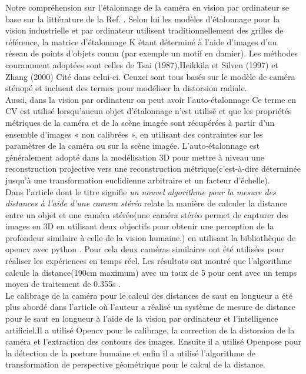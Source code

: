 \documentclass[12pt,a4paper]{report}
\begin{document}
Notre compréhension sur l'étalonnage de la caméra en vision par ordinateur se base sur la littérature de la Ref. \cite{remondino_digital_2006}. Selon lui les modèles d'étalonnage pour la vision industrielle et par ordinateur utilisent traditionnellement des grilles de référence, la matrice d'étalonnage K étant déterminé à l'aide d'images d'un réseau de points d'objets connu (par exemple un motif en damier). Les méthodes couramment adoptées sont celles de Tsai (1987),Heikkila et Silven (1997) et Zhang (2000) Cité dans celui-ci. Ceux­ci sont tous basés sur le modèle de caméra sténopé et incluent des termes pour modéliser la distorsion radiale.\\

Aussi, dans la vision par ordinateur on peut avoir l'auto-étalonnage Ce terme en CV est utilisé lorsqu'aucun objet d'étalonnage n'est utilisé et que les propriétés métriques de la caméra et de la scène imagée sont récupérées à partir d’un ensemble d’images « non calibrées », en utilisant des contraintes sur les paramètres de la caméra ou sur la scène imagée. L'auto-étalonnage est généralement adopté dans la modélisation 3D pour mettre à niveau une reconstruction projective vers une reconstruction métrique(c'est-à-dire déterminée jusqu'à une transformation euclidienne arbitraire et un facteur d'échelle).\\


Dans l'article \cite{adil_novel_2022} dont le titre signifie \textit{un nouvel algorithme pour la mesure des distances à l'aide d'une camera stéréo} relate la manière de calculer la distance entre un objet et une caméra stéréo(une caméra stéréo permet de capturer des images en 3D en utilisant deux objectifs pour obtenir une perception de la profondeur similaire à celle de la vision humaine.) en utilisant la bibliothèque de opencv avec python . Pour cela deux caméras similaires ont ­été utilisées pour réaliser les expériences en temps réel. Les résultats ont montré que l'algorithme calcule la distance(190cm maximum) avec un taux de 5 pour cent avec un temps moyen de traitement de 0.355s . \\


Le calibrage de la caméra pour le calcul des distances de saut en longueur a été plus abordé dans l'article \cite{jin_2022-3-exploring_2022} où l'auteur a réalisé un système de mesure de distance pour le saut en longueur à l'aide de la vision par ordinateur et l'intelligence artificiel.Il a utilisé Opencv pour le calibrage, la correction de la distorsion de la caméra et l'extraction des contours des images. Ensuite il a utilisé Openpose pour la détection de la posture humaine et enfin il a utilisé l'algorithme de transformation de perspective géométrique pour le calcul de la distance.
\end{document}
